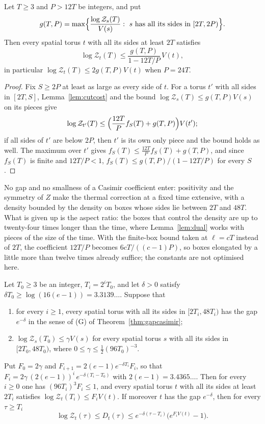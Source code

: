 \begin{proposition}\label{prop:extensive}
Let $T\ge3$ and $P>12T$ be integers, and put
\[
g(T,P)=\max\Bigl\{\frac{\log\mathcal Z_s(T)}{V(s)}:\ s\ \text{has all its
sides in }[2T,2P)\Bigr\}.
\]
Then every spatial torus $t$ with all its sides at least $2T$ satisfies
\[
\log\mathcal Z_t(T)\le\frac{g(T,P)}{1-12T/P}\,V(t),
\]
in particular $\log\mathcal Z_t(T)\le2g(T,P)V(t)$ when $P=24T$.
\end{proposition}

\begin{proof}
Fix $S\ge2P$ at least as large as every side of $t$. For a torus $t'$ with
all sides in $[2T,S]$, Lemma~\ref{lem:cutcost} and the bound $\log\mathcal
Z_s(T)\le g(T,P)V(s)$ on its pieces give
\[
\log\mathcal Z_{t'}(T)\le\Bigl(\frac{12T}Pf_S(T)+g(T,P)\Bigr)V(t');
\]
if all sides of $t'$ are below $2P$, then $t'$ is its own only piece and
the bound holds as well. The maximum over $t'$ gives $f_S(T)\le\frac{12T}P
f_S(T)+g(T,P)$, and since $f_S(T)$ is finite and $12T/P<1$, $f_S(T)\le g(T,
P)/(1-12T/P)$ for every $S$.
\end{proof}

No gap and no smallness of a Casimir coefficient enter: positivity and the
symmetry of $Z$ make the thermal correction at a fixed time extensive, with
a density bounded by the density on boxes whose sides lie between $2T$ and
$48T$. What is given up is the aspect ratio: the boxes that control the
density are up to twenty-four times longer than the time, where
Lemma~\ref{lem:dual} works with pieces of the size of the time. With the
finite-box bound taken at $\ell=cT$ instead of $2T$, the coefficient $12T/P$
becomes $6cT/((c-1)P)$, so boxes elongated by a little more than twelve
times already suffice; the constants are not optimised here.

\begin{theorem}\label{thm:ascent}
Let $T_0\ge3$ be an integer, $T_i=2^iT_0$, and let $\delta>0$ satisfy
$\delta T_0\ge\log(16(e-1))=3.3139\ldots$. Suppose that
\begin{enumerate}[leftmargin=*]
\item[\textup{(G$_{24}$)}] for every $i\ge1$, every spatial torus with all
its sides in $[2T_i,48T_i)$ has the gap $e^{-\delta}$ in the sense of
\textup{(G)} of Theorem~\ref{thm:gapcasimir};
\item[\textup{(B$_{24}$)}] $\log\mathcal Z_s(T_0)\le\gamma V(s)$ for every
spatial torus $s$ with all its sides in $[2T_0,48T_0)$, where $0\le\gamma
\le\frac12(96T_0)^{-3}$.
\end{enumerate}
Put $F_0=2\gamma$ and $F_{i+1}=2(e-1)e^{-\delta T_i}F_i$, so that
$F_i=2\gamma\,(2(e-1))^i\,e^{-\delta(T_i-T_0)}$ with $2(e-1)=3.4365\ldots$.
Then for every $i\ge0$ one has $(96T_i)^3F_i\le1$, and every spatial torus
$t$ with all its sides at least $2T_i$ satisfies $\log\mathcal Z_t(T_i)\le
F_iV(t)$. If moreover $t$ has the gap $e^{-\delta}$, then for every $\tau
\ge T_i$
\begin{equation}\label{eq:ascentall}
\log\mathcal Z_t(\tau)\le D_t(\tau)\le e^{-\delta(\tau-T_i)}\bigl(e^{F_iV(t)}
-1\bigr).
\end{equation}
\end{theorem}


